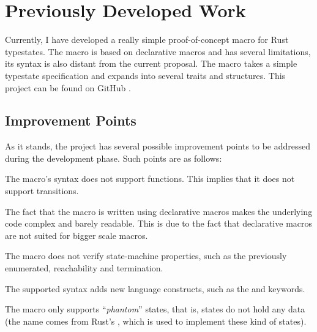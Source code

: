 \section{Previously Developed Work}

Currently, I have developed a really simple proof-of-concept macro for Rust typestates.
The macro is based on declarative macros and has several limitations,
its syntax is also distant from the current proposal.
The macro takes a simple typestate specification and expands into several traits and structures.
This project can be found on GitHub \autocite{Duarte2020a}.

\subsection{Improvement Points}

As it stands, the project has several possible improvement points to be addressed during the development phase.
Such points are as follows:
\begin{compactitem}
    \item The macro's syntax does not support functions. This implies that it does not support transitions.
    \item The fact that the macro is written using declarative macros makes the underlying code complex and barely readable.
    This is due to the fact that declarative macros are not suited for bigger scale macros.
    \item The macro does not verify state-machine properties, such as the previously enumerated, reachability and termination.
    \item The supported syntax adds new language constructs, such as the  and  keywords.
    \item The macro only supports “\emph{phantom}” states, that is, states do not hold any data
    (the name comes from Rust's , which is used to implement these kind of states).
\end{compactitem}



